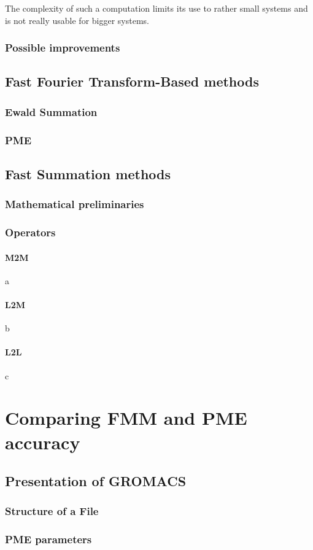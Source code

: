 \documentclass[12pt,twoside,a4paper]{report}
\begin{document}
The complexity of such a computation limits its use to rather small systems and is not really usable for bigger systems.

\subsection{Possible improvements}





\section{Fast Fourier Transform-Based methods}
\subsection{Ewald Summation}
\subsection{PME}

\section{Fast Summation methods}
	\subsection{Mathematical preliminaries}
	\subsection{Operators}
		\subsubsection{M2M}
		a
		\subsubsection{L2M}
		b
		\subsubsection{L2L}
		c


\chapter{Comparing FMM and PME accuracy}
\section{Presentation of GROMACS}
	\subsection{Structure of a File}
	\subsection{PME parameters}

\nocite{*}

 
\end{document}
